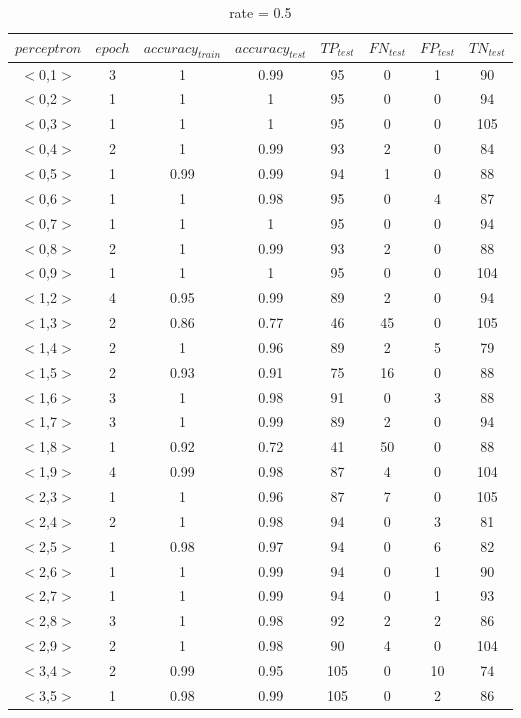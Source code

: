 \documentclass[11pt,letterpaper,oneside]{article}
\begin{document}
\begin{table}[th]
\caption{rate = 0.5}
\centering
\begin{tabular*}{\textwidth}{@{\extracolsep{\fill}}cccccccc}
\hline
$perceptron$ & $epoch$ & $accuracy_{train}$ & $accuracy_{test}$ & $TP_{test}$ & $FN_{test}$ & $FP_{test}$ & $TN_{test}$\\ \hline
$<$0,1$>$ & 3 & 1 & 0.99 & 95 & 0 & 1 & 90\\
$<$0,2$>$ & 1 & 1 & 1 & 95 & 0 & 0 & 94\\
$<$0,3$>$ & 1 & 1 & 1 & 95 & 0 & 0 & 105\\
$<$0,4$>$ & 2 & 1 & 0.99 & 93 & 2 & 0 & 84\\
$<$0,5$>$ & 1 & 0.99 & 0.99 & 94 & 1 & 0 & 88\\
$<$0,6$>$ & 1 & 1 & 0.98 & 95 & 0 & 4 & 87\\
$<$0,7$>$ & 1 & 1 & 1 & 95 & 0 & 0 & 94\\
$<$0,8$>$ & 2 & 1 & 0.99 & 93 & 2 & 0 & 88\\
$<$0,9$>$ & 1 & 1 & 1 & 95 & 0 & 0 & 104\\
$<$1,2$>$ & 4 & 0.95 & 0.99 & 89 & 2 & 0 & 94\\
$<$1,3$>$ & 2 & 0.86 & 0.77 & 46 & 45 & 0 & 105\\
$<$1,4$>$ & 2 & 1 & 0.96 & 89 & 2 & 5 & 79\\
$<$1,5$>$ & 2 & 0.93 & 0.91 & 75 & 16 & 0 & 88\\
$<$1,6$>$ & 3 & 1 & 0.98 & 91 & 0 & 3 & 88\\
$<$1,7$>$ & 3 & 1 & 0.99 & 89 & 2 & 0 & 94\\
$<$1,8$>$ & 1 & 0.92 & 0.72 & 41 & 50 & 0 & 88\\
$<$1,9$>$ & 4 & 0.99 & 0.98 & 87 & 4 & 0 & 104\\
$<$2,3$>$ & 1 & 1 & 0.96 & 87 & 7 & 0 & 105\\
$<$2,4$>$ & 2 & 1 & 0.98 & 94 & 0 & 3 & 81\\
$<$2,5$>$ & 1 & 0.98 & 0.97 & 94 & 0 & 6 & 82\\
$<$2,6$>$ & 1 & 1 & 0.99 & 94 & 0 & 1 & 90\\
$<$2,7$>$ & 1 & 1 & 0.99 & 94 & 0 & 1 & 93\\
$<$2,8$>$ & 3 & 1 & 0.98 & 92 & 2 & 2 & 86\\
$<$2,9$>$ & 2 & 1 & 0.98 & 90 & 4 & 0 & 104\\
$<$3,4$>$ & 2 & 0.99 & 0.95 & 105 & 0 & 10 & 74\\
$<$3,5$>$ & 1 & 0.98 & 0.99 & 105 & 0 & 2 & 86\\

\end{tabular*}
\end{table}
\end{document}
